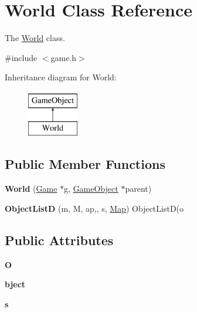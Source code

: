 \hypertarget{class_world}{}\section{World Class Reference}
\label{class_world}


The \hyperlink{class_world}{World} class.  




{\ttfamily \#include $<$game.\+h$>$}

Inheritance diagram for World\+:\begin{figure}[H]
\begin{center}
\leavevmode
\includegraphics[height=2.000000cm]{class_world}
\end{center}
\end{figure}
\subsection*{Public Member Functions}
\begin{DoxyCompactItemize}
\item 
\hypertarget{class_world_a8f2e7de9a7533ed84dbff13b73ab77ef}{}\label{class_world_a8f2e7de9a7533ed84dbff13b73ab77ef} 
{\bfseries World} (\hyperlink{class_game}{Game} $\ast$g, \hyperlink{class_game_object}{Game\+Object} $\ast$parent)
\item 
\hypertarget{class_world_a7fe6abb143814e0f87145648982f46af}{}\label{class_world_a7fe6abb143814e0f87145648982f46af} 
{\bfseries Object\+ListD} (m, M, ap,, s, \hyperlink{class_map}{Map}) Object\+ListD(o
\end{DoxyCompactItemize}
\subsection*{Public Attributes}
\begin{DoxyCompactItemize}
\item 
\hypertarget{class_world_a180c9e33dc6e59ca8e097bc9e6a36503}{}\label{class_world_a180c9e33dc6e59ca8e097bc9e6a36503} 
{\bfseries O}
\item 
\hypertarget{class_world_a2c3ed57fb27e57a197a2218f196950e2}{}\label{class_world_a2c3ed57fb27e57a197a2218f196950e2} 
{\bfseries bject}
\item 
\hypertarget{class_world_a985aab8b792338c2a1718f4ec46f88dc}{}\label{class_world_a985aab8b792338c2a1718f4ec46f88dc} 
{\bfseries s}
\end{DoxyCompactItemize}
